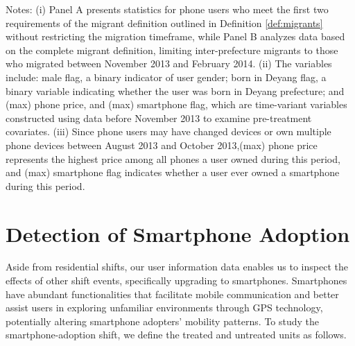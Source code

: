 \vspace{-2em}
\begin{singlespace}
\begin{footnotesize}
\noindent Notes: (i) Panel A presents statistics for phone users who meet the first two requirements of the migrant definition outlined in Definition \ref{def:migrants} without restricting the migration timeframe, while Panel B analyzes data based on the complete migrant definition, limiting inter-prefecture migrants to those who migrated between November 2013 and February 2014. (ii) The variables include: male flag, a binary indicator of user gender; born in Deyang flag, a binary variable indicating whether the user was born in Deyang prefecture; and (max) phone price, and (max) smartphone flag, which are time-variant variables constructed using data before November 2013 to examine pre-treatment covariates. (iii) Since phone users may have changed devices or own multiple phone devices between August 2013 and October 2013,(max) phone price represents the highest price among all phones a user owned during this period, and (max) smartphone flag indicates whether a user ever owned a smartphone during this period.
\end{footnotesize}
\end{singlespace}




\clearpage\newpage
\section{Detection of Smartphone Adoption}
Aside from residential shifts, our user information data enables us to inspect the effects of other shift events, specifically upgrading to smartphones. Smartphones have abundant functionalities that facilitate mobile communication and better assist users in exploring unfamiliar environments through GPS technology, potentially altering smartphone adopters' mobility patterns. To study the smartphone-adoption shift, we define the treated and untreated units as follows.

